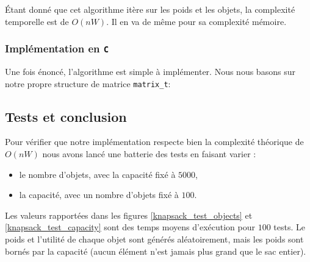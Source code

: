 Étant donné que cet algorithme itère sur les poids et les objets, la
complexité temporelle est de $O(nW)$. Il en va de même pour sa
complexité mémoire.

\subsubsection{Implémentation en \texttt{C}}
Une fois énoncé, l'algorithme est simple à implémenter. Nous nous
basons sur notre propre structure de matrice \texttt{matrix\_t}:

 


\subsection{Tests et conclusion}

Pour vérifier que notre implémentation respecte bien la complexité théorique de $O(nW)$ nous avons lancé une batterie des tests en faisant varier : 

\begin{itemize}
\item le nombre d'objets, avec la capacité fixé à $5000$,
\item la capacité, avec un nombre d'objets fixé à $100$.
\end{itemize}

Les valeurs rapportées dans les figures \ref{knapsack_test_objects} et
\ref{knapsack_test_capacity} sont des temps moyens d'exécution pour
$100$ tests. Le poids et l'utilité de chaque objet sont générés
aléatoirement, mais les poids sont bornés par la capacité (aucun
élément n'est jamais plus grand que le sac entier).

